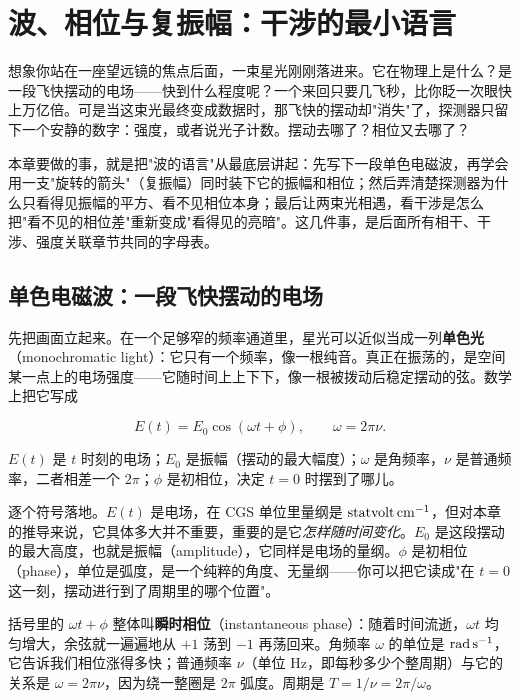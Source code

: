 \chapter{波、相位与复振幅：干涉的最小语言}
\label{chap:e01}

\begin{chapteropening}
想象你站在一座望远镜的焦点后面，一束星光刚刚落进来。它在物理上是什么？是一段飞快摆动的电场——快到什么程度呢？一个来回只要几飞秒，比你眨一次眼快上万亿倍。可是当这束光最终变成数据时，那飞快的摆动却"消失"了，探测器只留下一个安静的数字：强度，或者说光子计数。摆动去哪了？相位又去哪了？

本章要做的事，就是把"波的语言"从最底层讲起：先写下一段单色电磁波，再学会用一支"旋转的箭头"（复振幅）同时装下它的振幅和相位；然后弄清楚探测器为什么只看得见振幅的平方、看不见相位本身；最后让两束光相遇，看干涉是怎么把"看不见的相位差"重新变成"看得见的亮暗"。这几件事，是后面所有相干、干涉、强度关联章节共同的字母表。
\end{chapteropening}

\section{单色电磁波：一段飞快摆动的电场}
\label{sec:e01-wave}

先把画面立起来。在一个足够窄的频率通道里，星光可以近似当成一列\textbf{单色光}（monochromatic light）：它只有一个频率，像一根纯音。真正在振荡的，是空间某一点上的电场强度——它随时间上上下下，像一根被拨动后稳定摆动的弦。数学上把它写成

\begin{equation}
  E(t)=E_0\cos(\omega t+\phi),\qquad \omega=2\pi\nu .
  \label{eq:e01-monochromatic}
\end{equation}
\begin{formulaexplain}
\(E(t)\) 是 \(t\) 时刻的电场；\(E_0\) 是振幅（摆动的最大幅度）；\(\omega\) 是角频率，\(\nu\) 是普通频率，二者相差一个 \(2\pi\)；\(\phi\) 是初相位，决定 \(t=0\) 时摆到了哪儿。
\end{formulaexplain}

逐个符号落地。\(E(t)\) 是电场，在 CGS 单位里量纲是 \({\rm statvolt\,cm^{-1}}\)，但对本章的推导来说，它具体多大并不重要，重要的是它\emph{怎样随时间变化}。\(E_0\) 是这段摆动的最大高度，也就是振幅（amplitude），它同样是电场的量纲。\(\phi\) 是初相位（phase），单位是弧度，是一个纯粹的角度、无量纲——你可以把它读成"在 \(t=0\) 这一刻，摆动进行到了周期里的哪个位置"。

括号里的 \(\omega t+\phi\) 整体叫\textbf{瞬时相位}（instantaneous phase）：随着时间流逝，\(\omega t\) 均匀增大，余弦就一遍遍地从 \(+1\) 荡到 \(-1\) 再荡回来。角频率 \(\omega\) 的单位是 \({\rm rad\,s^{-1}}\)，它告诉我们相位涨得多快；普通频率 \(\nu\)（单位 Hz，即每秒多少个整周期）与它的关系是 \(\omega=2\pi\nu\)，因为绕一整圈是 \(2\pi\) 弧度。周期是 \(T=1/\nu=2\pi/\omega\)。

